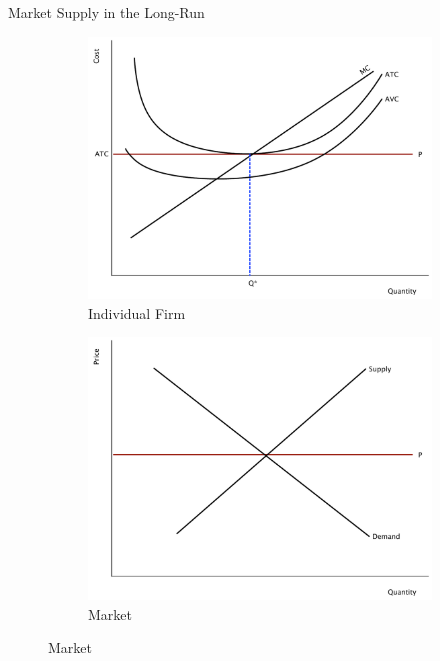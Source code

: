 \documentclass[xcolor={dvipsnames},pdf, hyperref={colorlinks=true, citecolor=ForestGreen, linkcolor=BlueViolet, urlcolor=Magenta}, handout]{beamer}
\begin{document}
\begin{frame}{Market Supply in the Long-Run}

	\begin{figure}[H]
		\centering
		\caption{Perfectly Competitive Market in Long-run}
		\begin{subfigure}{.35\textwidth}
			\includegraphics[scale=.2]{plot68.pdf}
			\caption{Individual Firm}
		\end{subfigure}%
		\begin{subfigure}{.35\textwidth}
			\centering
			\includegraphics[scale=.2]{plot69.pdf}
			\caption{Market}
		\end{subfigure}
	\end{figure}
	
	
\end{frame}
\end{document}
